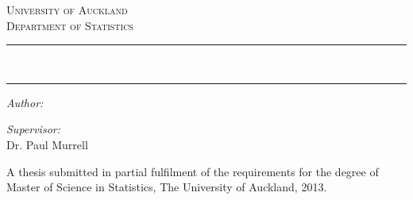 \begin{titlepage}
\begin{center}
\singlespacing
\vspace*{2.5cm}


\vspace{1cm}

\textsc{\LARGE University of Auckland} \\[0.4cm]
\textsc{\Large Department of Statistics} \\[1cm]

\hrule
\vspace{0.3cm} %
{\Large \doctitle{}} \\[0.2cm]
\hrule
\vspace{1cm}

\begin{minipage}{0.4\textwidth}
\begin{flushleft} \large
\emph{Author:}\\
\docauthor{}
\end{flushleft}
\end{minipage}
\begin{minipage}{0.4\textwidth}
\begin{flushright} \large
\emph{Supervisor:} \\
Dr. Paul Murrell
\end{flushright}
\end{minipage}

\vfill

{\large
A thesis submitted in partial fulfilment of the requirements for the
degree of Master of Science in Statistics, The University of Auckland, 2013.}

\onehalfspacing
\end{center}
\end{titlepage}


